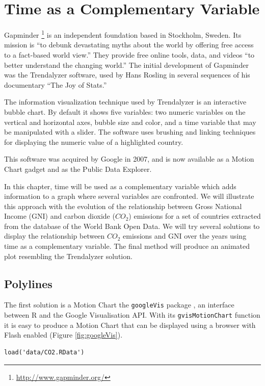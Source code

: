\documentclass[smallroyalvopaper]{memoir}
\begin{document}
\chapter{Time as a Complementary Variable}
\label{sec:orgheadline21}
\label{cha:timeComplementary}

Gapminder \footnote{\url{http://www.gapminder.org/}} is an independent foundation based in Stockholm, Sweden.  Its mission is ``to debunk devastating myths about the world by offering free access to a fact-based world view.'' They provide free online tools, data, and videos ``to better understand the changing world.'' The initial development of Gapminder was the Trendalyzer software, used by Hans Rosling in several sequences of his documentary ``The Joy of Stats.''

The information visualization technique used by Trendalyzer is an interactive bubble chart. By default it shows five variables: two numeric variables on the vertical and horizontal axes, bubble size and color, and a time variable that may be manipulated with a slider. The software uses brushing and linking techniques for displaying the numeric value of a highlighted country.

This software was acquired by Google in 2007, and is now available as a Motion Chart gadget and as the Public Data Explorer.

In this chapter, time will be used as a complementary variable which adds information to a graph where several variables are confronted. We will illustrate this approach with the evolution of the relationship between Gross National Income (GNI) and carbon dioxide (\(CO_2\)) emissions for a set of countries extracted from the database of the World Bank Open Data. We will try several solutions to display the relationship between \(CO_2\) emissions and GNI over the years using time as a complementary variable. The final method will produce an animated plot resembling the Trendalyzer solution.

\section{Polylines}
\label{sec-1}
The first solution is a Motion Chart the \texttt{googleVis} package
\cite{Gesmann.deCastillo2011}, an interface between R and the Google
Visualisation API. With its \texttt{gvisMotionChart} function it is easy to
produce a Motion Chart that can be displayed using a browser with
Flash enabled (Figure \ref{fig:googleVis}).

\lstset{language=R,numbers=none}
\begin{lstlisting}
load('data/CO2.RData')
\end{lstlisting}
\end{document}

